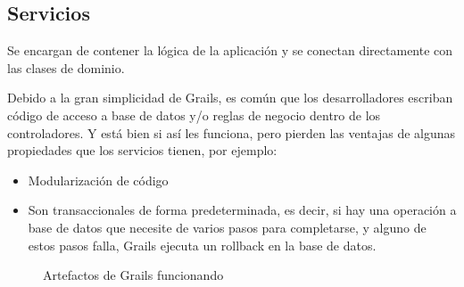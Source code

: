 \subsection{Servicios}
Se encargan de contener la l\'ogica de la aplicaci\'on y se conectan directamente con las clases de dominio.

Debido a la gran simplicidad de Grails, es com\'un que los desarrolladores escriban c\'odigo de acceso a base de datos y/o reglas de negocio dentro de los controladores. Y est\'a bien si as\'i les funciona, pero pierden las ventajas de algunas propiedades que los servicios tienen, por ejemplo:

\begin{itemize}
 \item Modularizaci\'on de c\'odigo
 \item Son transaccionales de forma predeterminada, es decir, si hay una operaci\'on a base de datos que necesite de varios pasos para completarse, y alguno de estos pasos falla, Grails ejecuta un rollback en la base de datos.
\end{itemize}



\begin{figure}[ht!]
    \caption{Artefactos de Grails funcionando}
\end{figure}